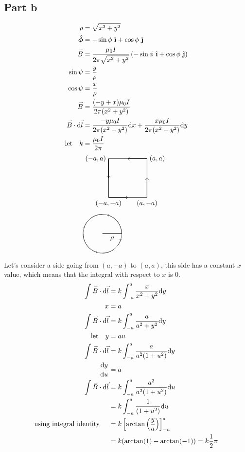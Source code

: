 \documentclass{article}
\newcommand{\ihat}{\ {\hat{\textbf{\i}}}}
\newcommand{\jhat}{\ {\hat{\textbf{\j}}}}
\newcommand{\phat}{\ \boldsymbol{\hat{\phi}}}
\renewcommand{\d}{\text{d}}
\renewcommand{\vec}[1]{\accentset{\rightharpoonup}{#1}}
\newcommand{\dvecdot}[2]{\vec{#1}\cdot\d \vec{#2}}
\begin{document}
\subsection*{Part b}
\begin{align*}
    \rho &= \sqrt{x^2+y^2}\\
    \phat &= -\sin \phi \ihat + \cos\phi \jhat\\
    \vec{B} &= \frac{\mu_0 I}{2\pi\sqrt{x^2+y^2}} \left(-\sin \phi \ihat + \cos\phi \jhat\right)\\
    \sin\psi &= \frac{y}{\rho}\\
    \cos\psi &= \frac{x}{\rho}\\
    \vec{B} &= \frac{(-y + x)\mu_0 I}{2\pi (x^2+y^2)}\\
    \dvecdot{B}{l} &= \frac{-y \mu_0 I}{2\pi (x^2+y^2)} \d x + \frac{x \mu_0 I}{2\pi (x^2+y^2)} \d y\\
    \text{let}\quad k &= \frac{\mu_0 I}{2\pi}\\
    &\begin{tikzpicture}[x=2cm, y=2cm]
        \draw[thick] (0,0) -- (1,0) node[anchor=north,midway]{$$} node[anchor=north]{$(a, -a)$};
        \draw[thick,->] (0,0) -- (0.5,0);
        \draw[thick] (1,0) -- (1,1) node[anchor=west,midway]{$$} node[anchor=west]{$(a, a)$};
        \draw[thick,->] (1,0) -- (1,0.5);
        \draw[thick] (1,1) -- (0,1) node[anchor=south,midway]{$$} node[anchor=east]{$(-a, a)$};
        \draw[thick,->] (1,1) -- (0.5,1);
        \draw[thick] (0,1) -- (0,0) node[anchor=east,midway]{$$} node[anchor=north]{$(-a, -a)$};
        \draw[thick,->] (0,1) -- (0,0.5);
    \end{tikzpicture}\\
    &\begin{tikzpicture}
        \draw(0,0) circle (1cm);
        \draw[thick] (0,0) -- (1,0) node[anchor=north,midway]{$\rho$};
        \draw[->] (1, 0) arc (0:75:1cm);
        \draw[->] (-1, 0) arc (180:180+75:1cm);
        \draw[->] (0, 1) arc (90:90+75:1cm);
        \draw[->] (0, -1) arc (270:270+75:1cm);
    \end{tikzpicture}\\
\end{align*}
Let's consider a side going from $(a,-a)$ to $(a,a)$, this side has a constant $x$ value, which means that 
the integral with respect to $x$ is 0.
\begin{align*}
    \int \dvecdot{B}{l} &= k \int_{-a}^a \frac{x}{x^2+y^2}\d y\\
    x &= a\\
    \int \dvecdot{B}{l} &= k \int_{-a}^a \frac{a}{a^2+y^2}\d y\\
    \text{let}\quad y &= au\\
    \int \dvecdot{B}{l} &= k \int_{-a}^a \frac{a}{a^2(1+u^2)}\d y\\
    \dv{y}{u} &= a\\
    \int \dvecdot{B}{l} &= k \int_{-a}^a \frac{a^2}{a^2(1+u^2)} \d u\\
    &= k \int_{-a}^a \frac{1}{(1+u^2)} \d u\\
    \text{using integral identity }\quad &= k \left[\arctan\left(\frac{y}{a}\right)\right]_{-a}^{a} \\
    &= k (\arctan(1) - \arctan(-1)) = k\frac{1}{2}\pi
\end{align*}
\end{document}
